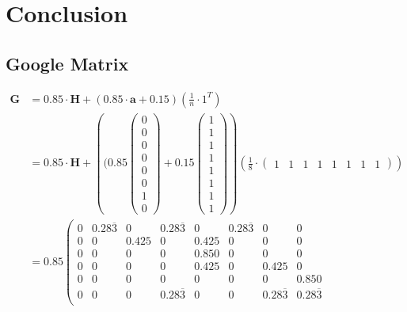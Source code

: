 \documentclass[11pt]{report}
\begin{document}
\chapter{Conclusion} \label{chap:Conclusion}

\newpage
{}


\begin{appendices}
\chapter{Google Matrix}
\begin{align*}
\textbf{G} &  = 0.85\cdot\textbf{H} + (0.85\cdot\textbf{a} + 0.15)\left(\frac{1}{n}\cdot 1^T\right)\\
& = 0.85\cdot\textbf{H} + \left((0.85\left(\begin{array}{c}
0\\0\\0\\0\\0\\0\\1\\0\end{array}\right) + 0.15\left(\begin{array}{c}
1\\1\\1\\1\\1\\1\\1\\1\end{array}\right)\right)\left(\frac{1}{8}\cdot\left(\begin{array}{cccccccc}
1&1&1&1&1&1&1&1\end{array}\right)\right)\\
&= 0.85\left(
\begin{array}{cccccccc}
0 & 0.28\overline{3} & 0 & 0.28\overline{3} & 0 & 0.28\overline{3} & 0 & 0  \\
0 & 0 & 0.425 & 0 & 0.425 & 0 & 0 & 0  \\
0 & 0 & 0 & 0 & 0.850 & 0 & 0 & 0  \\
0 & 0 & 0 & 0 & 0.425 & 0 & 0.425 & 0  \\
0 & 0 & 0 & 0 & 0 & 0 & 0 & 0.850  \\
0 & 0 & 0 & 0.28\overline{3} & 0 & 0 & 0.28\overline{3} & 0.28\overline{3}  \\

\end{array}
\end{align*}
\end{appendices}
\end{document}

